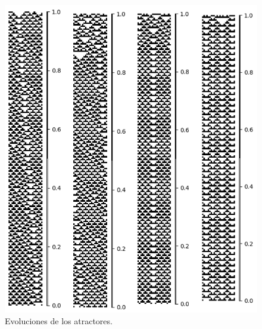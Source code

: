 \documentclass[11pt]{article}
\begin{document}
			\begin{figure}[H]
			\centering
			\includegraphics[scale=0.3]{resources/Atractores54/atractor_54_size_23_res.png}
			\caption{Evoluciones de los atractores.}\label{fig:picture}
			\end{figure}
\end{document}
